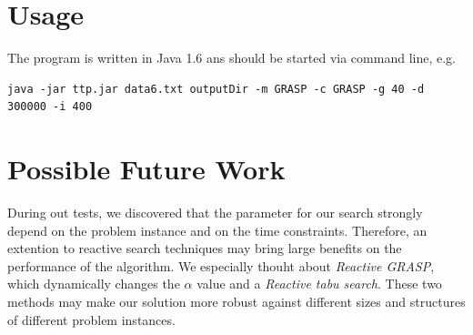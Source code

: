 \documentclass[a4paper,11pt]{article}
\begin{document}
\section{Usage}
The program is written in Java 1.6 ans should be started via command line, e.g.
\small
\lstset{language=sh}
\begin{lstlisting}
java -jar ttp.jar data6.txt outputDir -m GRASP -c GRASP -g 40 -d 300000 -i 400
\end{lstlisting}

\section{Possible Future Work}
During out tests, we discovered that the parameter for our search strongly depend on the problem instance and on the time constraints. Therefore,
an extention to reactive search techniques may bring large benefits on the performance of the algorithm. We especially thouht about \emph{Reactive GRASP},
 which dynamically changes the $\alpha$ value and a \emph{Reactive tabu search}. These two methods may make our solution more robust against different
sizes and structures of different problem instances.

\small


\end{document}
